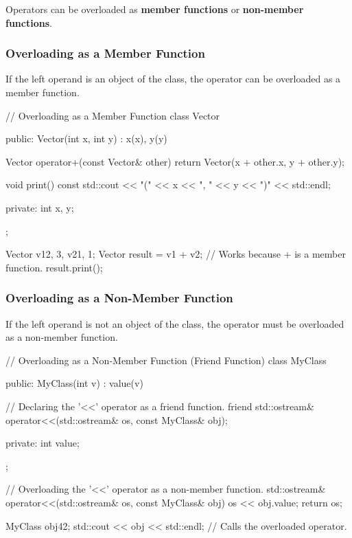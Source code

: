 Operators can be overloaded as \textbf{member functions} or \textbf{non-member functions}.

\subsubsection{Overloading as a Member Function}

If the left operand is an object of the class, the operator can be overloaded as a member function.

\begin{codeblock}[language=C++, numbers=none]
// Overloading as a Member Function
class Vector {
public:
    Vector(int x, int y) : x(x), y(y) {}

    Vector operator+(const Vector& other) {
        return Vector(x + other.x, y + other.y);
    }

    void print() const {
        std::cout << "(" << x << ", " << y << ")" << std::endl;
    }

private:
    int x, y;
};

Vector v1{2, 3}, v2{1, 1};
Vector result = v1 + v2; // Works because + is a member function.
result.print();
\end{codeblock}

\subsubsection{Overloading as a Non-Member Function}

If the left operand is not an object of the class, the operator must be overloaded as a non-member function.

\begin{codeblock}[language=C++, numbers=none]
// Overloading as a Non-Member Function (Friend Function)
class MyClass {
public:
    MyClass(int v) : value(v) {}

    // Declaring the '<<' operator as a friend function.
    friend std::ostream& operator<<(std::ostream& os, const MyClass& obj);

private:
    int value;
};

// Overloading the '<<' operator as a non-member function.
std::ostream& operator<<(std::ostream& os, const MyClass& obj) {
    os << obj.value;
    return os;
}

MyClass obj{42};
std::cout << obj << std::endl; // Calls the overloaded operator.
\end{codeblock}

